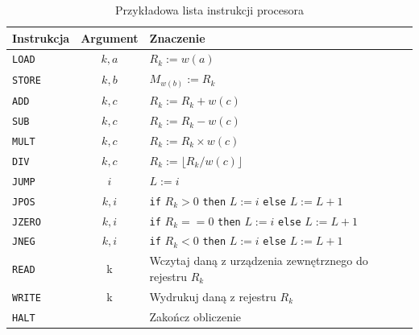 \begin{table}[H]
\begin{center}
\caption{Przykładowa lista instrukcji procesora\cite{Czech}}
\label{tab:ram_instructions}
\begin{tabular}{|l|c|l|}
\hline
Instrukcja & Argument & Znaczenie \\ \hline
\texttt{LOAD} & \(k, a\) & \(R_k:=w(a)\) \\
\texttt{STORE} & \(k, b\) & \(M_{w(b)}:=R_{k}\) \\
\texttt{ADD} & \(k, c\) & \(R_{k}:=R_{k}+w(c)\) \\
\texttt{SUB} & \(k, c\) & \(R_{k}:=R_{k}-w(c)\)\\
\texttt{MULT} & \(k, c\) & \(R_{k}:=R_{k} \times w(c)\)\\
\texttt{DIV} & \(k, c\) & \(R_{k}:=\lfloor R_{k}/w(c)\rfloor\) \\
\texttt{JUMP} &  \(i\) & \(L:=i\) \\
\texttt{JPOS} & \(k,i\) & \texttt{if} \(R_k>0\) \texttt{then} \(L:=i\) \texttt{else} \(L:=L+1\) \\
\texttt{JZERO} & \(k,i\) & \texttt{if} \(R_k==0\) \texttt{then} \(L:=i\) \texttt{else} \(L:=L+1\) \\
\texttt{JNEG} & \(k,i\) & \texttt{if} \(R_k<0\) \texttt{then} \(L:=i\) \texttt{else} \(L:=L+1\) \\
\texttt{READ} & k & Wczytaj daną z urządzenia zewnętrznego do rejestru \(R_k\) \\
\texttt{WRITE} & k & Wydrukuj daną z rejestru \(R_k\) \\
\texttt{HALT} & & Zakończ obliczenie \\ \hline
\end{tabular}
\end{center}
\end{table}

